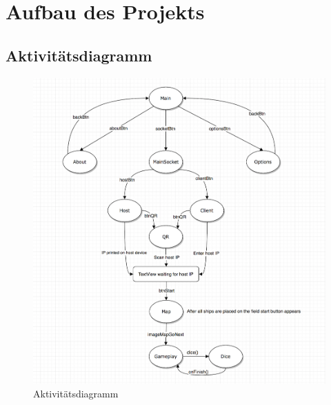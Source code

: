 \documentclass[11pt]{article} %
\begin{document}
\newpage
\section{Aufbau des Projekts}
\subsection{Aktivitätsdiagramm}
\begin{figure}[H]
	\centering
 	\includegraphics[width=1\textwidth]{img/activity}
	\caption{Aktivitätsdiagramm}
\end{figure}
\end{document}
